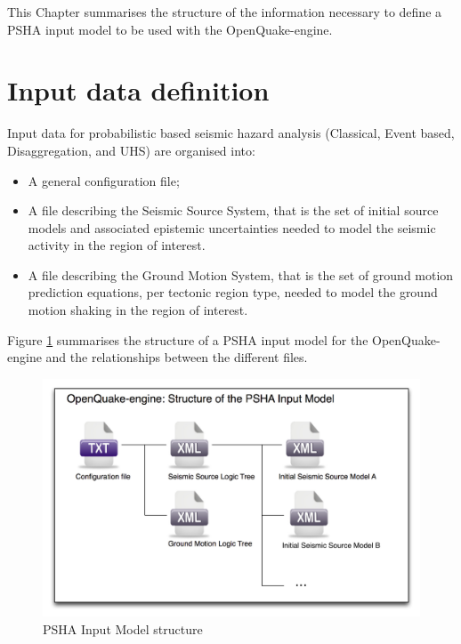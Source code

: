 This Chapter summarises the structure of the information necessary 
to define a PSHA input model to be used with the OpenQuake-engine.
\section{Input data definition}
\label{sec:hazInputData}
Input data for probabilistic based seismic hazard analysis (Classical, 
Event based, Disaggregation, and UHS) are organised into:
\begin{itemize}
\item A general configuration file;
\item A file describing the Seismic Source System, that is the set of 
    initial source models and associated epistemic uncertainties needed 
    to model the seismic activity in the region of interest.
\item A file describing the Ground Motion System, that is the set of ground 
    motion prediction equations, per tectonic region type, needed to model 
    the ground motion shaking in the region of interest.
\end{itemize}
%
Figure \ref{fig:psha_input} summarises the structure of a PSHA input model
for the OpenQuake-engine and the relationships between the different files.
\begin{figure}[!ht]
\centering
\includegraphics[width=14cm]{./figures/hazard/psha_input_structure.pdf}
\caption{PSHA Input Model structure}
\label{fig:psha_input}
\end{figure}
